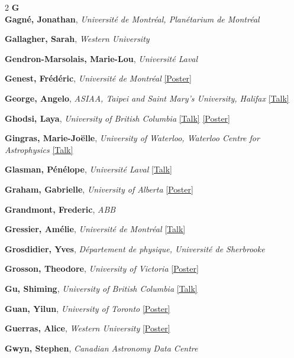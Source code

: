 \begin{small}
\begin{multicols}{2}
{\sffamily\bfseries\color{cascablue}\large G}\\[2pt]

\textbf{Gagné, Jonathan}, {\footnotesize\textit{Université de Montréal, Planétarium de Montréal}}\par
\textbf{Gallagher, Sarah}, {\footnotesize\textit{Western University}}\par
\textbf{Gendron-Marsolais, Marie-Lou}, {\footnotesize\textit{Université Laval}}\par
\textbf{Genest, Frédéric}, {\footnotesize\textit{Université de Montréal}} \hyperref[poster-abstract-page-talk-42]{\scriptsize\textcolor{cascateal}{[Poster]}}\par
\textbf{George, Angelo}, {\footnotesize\textit{ASIAA, Taipei and Saint Mary's University, Halifax}} \hyperref[abstract-page-talk-51]{\scriptsize\textcolor{cascablue}{[Talk]}}\par
\textbf{Ghodsi, Laya}, {\footnotesize\textit{University of British Columbia}} \hyperref[abstract-page-talk-145]{\scriptsize\textcolor{cascablue}{[Talk]}} \hyperref[poster-abstract-page-talk-297]{\scriptsize\textcolor{cascateal}{[Poster]}}\par
\textbf{Gingras, Marie-Joëlle}, {\footnotesize\textit{University of Waterloo, Waterloo Centre for Astrophysics}} \hyperref[abstract-page-talk-316]{\scriptsize\textcolor{cascablue}{[Talk]}}\par
\textbf{Glasman, Pénélope}, {\footnotesize\textit{Université Laval}} \hyperref[abstract-page-talk-101]{\scriptsize\textcolor{cascablue}{[Talk]}}\par
\textbf{Graham, Gabrielle}, {\footnotesize\textit{University of Alberta}} \hyperref[poster-abstract-page-talk-77]{\scriptsize\textcolor{cascateal}{[Poster]}}\par
\textbf{Grandmont, Frederic}, {\footnotesize\textit{ABB}}\par
\textbf{Gressier, Amélie}, {\footnotesize\textit{Université de Montréal}} \hyperref[abstract-page-talk-224]{\scriptsize\textcolor{cascablue}{[Talk]}}\par
\textbf{Grosdidier, Yves}, {\footnotesize\textit{Département de physique, Université de Sherbrooke}}\par
\textbf{Grosson, Theodore}, {\footnotesize\textit{University of Victoria}} \hyperref[poster-abstract-page-talk-148]{\scriptsize\textcolor{cascateal}{[Poster]}}\par
\textbf{Gu, Shiming}, {\footnotesize\textit{University of British Columbia}} \hyperref[abstract-page-talk-49]{\scriptsize\textcolor{cascablue}{[Talk]}}\par
\textbf{Guan, Yilun}, {\footnotesize\textit{University of Toronto}} \hyperref[poster-abstract-page-talk-44]{\scriptsize\textcolor{cascateal}{[Poster]}}\par
\textbf{Guerras, Alice}, {\footnotesize\textit{Western University}} \hyperref[poster-abstract-page-talk-199]{\scriptsize\textcolor{cascateal}{[Poster]}}\par
\textbf{Gwyn, Stephen}, {\footnotesize\textit{Canadian Astronomy Data Centre}}\par


\end{multicols}
\end{small}
